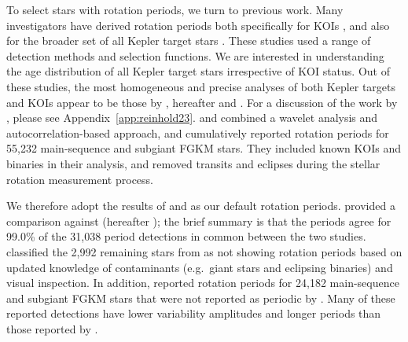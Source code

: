 \documentclass[11pt,twocolumn,tighten,linenumbers]{aastex63}
\begin{document}
To select stars with rotation periods, we turn to previous work.  Many
investigators have derived rotation periods both specifically for KOIs
\citep{McQuillan_2013,Walkowicz_2013,Mazeh_2015,Angus_2018,David_2021},
and also for the broader set of all Kepler target stars
\citep{McQuillan_2014,Reinhold_2015,Santos_2019,Santos_2021,Reinhold2023}.
These studies used a range of detection methods and selection
functions.  We are interested in understanding the age distribution of
all Kepler target stars irrespective of KOI status.  Out of these
studies, the most homogeneous and precise analyses of both Kepler
targets and KOIs appear to be those by
\citet{Santos_2019,Santos_2021}, hereafter 
and .  For a discussion of the work by
\citet{Reinhold2023}, please see Appendix~\ref{app:reinhold23}.
 and  combined a
wavelet analysis and autocorrelation-based approach, and cumulatively
reported rotation periods for 55{,}232 main-sequence and subgiant FGKM
stars.  They included known KOIs and binaries in their analysis, and
removed transits and eclipses during the stellar rotation measurement
process. 

We therefore adopt the results of  and
 as our default rotation periods.
 provided a comparison against
\citet{McQuillan_2014} (hereafter ); the brief summary is that the periods
agree for 99.0\% of the 31{,}038 period detections in common between
the two studies.   classified the 2{,}992
remaining stars from  as not showing
rotation periods based on updated knowledge of contaminants
(e.g.~giant stars and eclipsing binaries) and visual inspection.  In
addition,  reported rotation periods for
24{,}182 main-sequence and subgiant FGKM stars that were not reported
as periodic by .  Many of these reported
detections have lower variability amplitudes and longer periods than
those reported by . 
\end{document}
